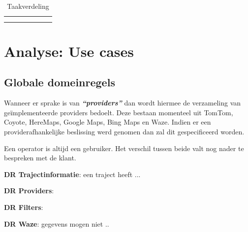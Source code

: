 \documentclass[a4paper]{article}
\begin{document}
\begin{table}[H]
\begin{tabular}{|c|c|c|c|c|c|c|}
                            &                                    &                      &                       &                      &                       &                      \\ \hline
                            &                                    &                      &                       &                      &                       &                      \\ \hline
                            &                                    &                      &                       &                      &                       &                      \\ \hline
\end{tabular}
\caption{Taakverdeling}
\label{tab:taakverdeling}
\end{table}




\section{Analyse: Use cases}
\subsection{Globale domeinregels}

Wanneer er sprake is van \textbf{\textit{``providers''}} dan wordt hiermee de verzameling van geïmplementeerde providers bedoelt. Deze bestaan momenteel uit TomTom, Coyote, HereMaps, Google Maps, Bing Maps en Waze. Indien er een providerafhankelijke beslissing werd genomen dan zal dit gespecificeerd worden.

Een operator is altijd een gebruiker. Het verschil tussen beide valt nog nader te bespreken met de klant.

\textbf{DR Trajectinformatie}: een traject heeft ...

\textbf{DR Providers}:

\textbf{DR Filters}:

\textbf{DR Waze}: gegevens mogen niet ..

\newpage

\end{document}
